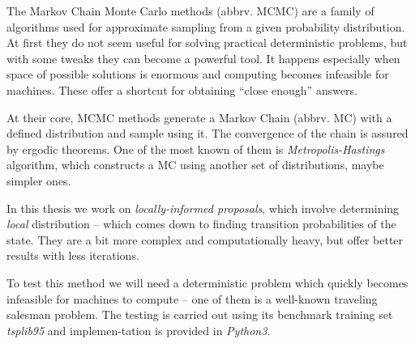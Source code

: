 The Markov Chain Monte Carlo methods (abbrv. MCMC) are a family of algorithms used for approximate sampling from a given probability distribution. At first they do not seem useful for solving practical deterministic problems, but with some tweaks they can become a powerful tool. It happens especially when space of possible solutions is enormous and computing becomes infeasible for machines. These offer a shortcut for obtaining ``close enough'' answers.
		
At their core, MCMC methods generate a Markov Chain (abbrv. MC) with a defined distribution and sample using it. The convergence of the chain is assured by ergodic theorems. One of the most known of them is \textit{Metropolis-Hastings} algorithm, which constructs a MC using another set of distributions, maybe simpler ones.

In this thesis we work on \textit{locally-informed proposals}, which involve determining \textit{local} distribution -- which comes down to finding transition probabilities of the state. They are a bit more complex and computationally heavy, but offer better results with less iterations. 

To test this method we will need a deterministic problem which quickly becomes infeasible for machines to compute -- one of them is a well-known traveling salesman problem. The testing is carried out using its benchmark training set \textit{tsplib95} and implemen-tation is provided in \textit{Python3}.